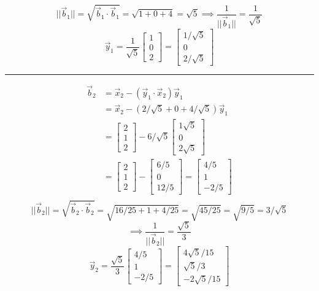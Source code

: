 \documentclass{report}
\begin{document}
$$
||\vec{b}_1|| = \sqrt{\vec{b}_1\cdot\vec{b}_1} = \sqrt{1 + 0 + 4} = \sqrt{5} \implies \frac{1}{||\vec{b}_1||} = \frac{1}{\sqrt{5}}
$$
\[
\vec{y}_1 = \frac{1}{\sqrt{5}}\begin{bmatrix}1\\0\\2\end{bmatrix} = \begin{bmatrix} 1/\sqrt{5} \\ 0 \\ 2/\sqrt{5} \end{bmatrix}
\]
\vspace{0.5em}
\hrule
\vspace{1em}
\[
\begin{aligned}
\vec{b}_2 &= \vec{x}_2 - (\vec{y}_1 \cdot \vec{x}_2)\vec{y}_1\\
&=\vec{x}_2 - (2/\sqrt{5} + 0 + 4/\sqrt{5})\vec{y}_1\\
&=\begin{bmatrix}2\\1\\2\end{bmatrix}-6/\sqrt{5}\begin{bmatrix}1\sqrt{5}\\0\\2\sqrt{5}\end{bmatrix}\\
&=\begin{bmatrix}2\\1\\2\end{bmatrix}-\begin{bmatrix}6/5\\0\\12/5\end{bmatrix} = \begin{bmatrix}4/5\\1\\-2/5\end{bmatrix}\\
\end{aligned}
\]
\[
||\vec{b}_2|| = \sqrt{\vec{b}_2\cdot\vec{b}_2} = \sqrt{16/25 + 1 + 4/25} = \sqrt{45/25} = \sqrt{9/5} = 3/\sqrt{5}
\]
\[
\implies \frac{1}{||\vec{b}_2||}=\frac{\sqrt{5}}{3}
\]
\[
\vec{y}_2 = \frac{\sqrt{5}}{3}\begin{bmatrix}4/5\\1\\-2/5\end{bmatrix} = \begin{bmatrix}4\sqrt{5}/15\\\sqrt{5}/3\\-2\sqrt{5}/15\end{bmatrix}
\]
\end{document}

